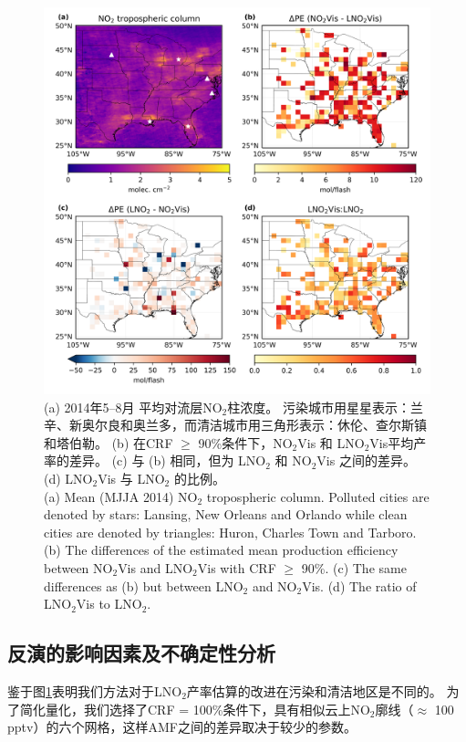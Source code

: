 \begin{figure}[t]
\centering
\includegraphics[width=13cm]{./figures/delta.png}
\caption{(a) 2014年5--8月  平均对流层NO$_\textrm{2}$柱浓度。
污染城市用星星表示：兰辛、新奥尔良和奥兰多，而清洁城市用三角形表示：休伦、查尔斯镇和塔伯勒。
(b) 在CRF $\geq$ 90\%条件下，NO$_\textrm{2}$Vis 和 LNO$_\textrm{2}$Vis平均产率的差异。
(c) 与 (b) 相同，但为 LNO$_\textrm{2}$ 和 NO$_\textrm{2}$Vis 之间的差异。
(d) LNO$_\textrm{2}$Vis 与 LNO$_\textrm{2}$ 的比例。\\
(a) Mean (MJJA 2014) NO$_\textrm{2}$ tropospheric column.
Polluted cities are denoted by stars: Lansing, New Orleans and Orlando while clean cities are denoted by triangles: Huron, Charles Town and Tarboro.
(b) The differences of the estimated mean production efficiency between NO$_\textrm{2}$Vis and LNO$_\textrm{2}$Vis with CRF $\geq$ 90\%.
(c) The same differences as (b) but between LNO$_\textrm{2}$ and NO$_\textrm{2}$Vis.
(d) The ratio of LNO$_\textrm{2}$Vis to LNO$_\textrm{2}$.
}
\label{fig:delta}
\end{figure}

\subsection{反演的影响因素及不确定性分析} \label{susbec:china_uncertainty}

鉴于图\ref{fig:delta}表明我们方法对于LNO$_2$产率估算的改进在污染和清洁地区是不同的。
为了简化量化，我们选择了CRF = 100\%条件下，具有相似云上NO$_2$廓线（$\approx$ 100 pptv）的六个网格，这样AMF之间的差异取决于较少的参数。

